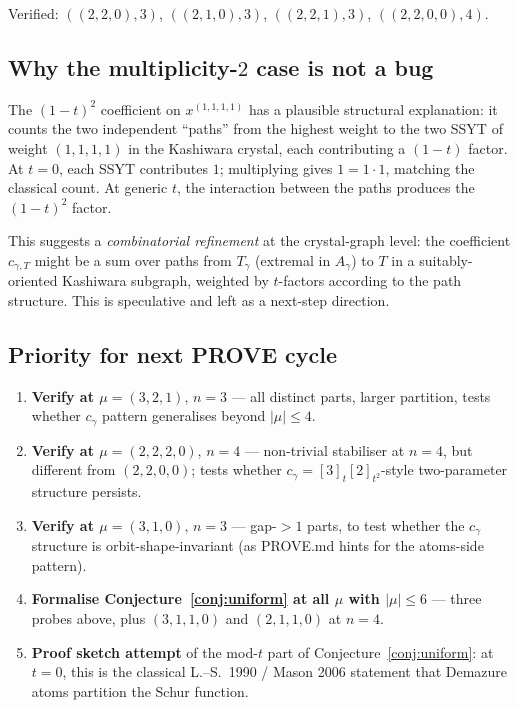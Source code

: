 \documentclass[11pt]{article}
\theoremstyle{definition}
\theoremstyle{remark}
\begin{document}
Verified: $((2,2,0), 3)$, $((2,1,0), 3)$, $((2,2,1), 3)$, $((2,2,0,0), 4)$.

\subsection{Why the multiplicity-$2$ case is not a bug}

The $(1-t)^2$ coefficient on $x^{(1,1,1,1)}$ has a plausible structural
explanation: it counts the two independent ``paths'' from the highest
weight to the two SSYT of weight $(1,1,1,1)$ in the Kashiwara crystal,
each contributing a $(1-t)$ factor. At $t=0$, each SSYT contributes
$1$; multiplying gives $1 = 1 \cdot 1$, matching the classical count.
At generic $t$, the interaction between the paths produces the
$(1-t)^2$ factor.

This suggests a \emph{combinatorial refinement} at the crystal-graph
level: the coefficient $c_{\gamma, T}$ might be a sum over paths from
$T_\gamma$ (extremal in $A_\gamma$) to $T$ in a suitably-oriented
Kashiwara subgraph, weighted by $t$-factors according to the path
structure. This is speculative and left as a next-step direction.

\subsection{Priority for next PROVE cycle}

\begin{enumerate}
   \item \textbf{Verify at $\mu = (3,2,1),\, n = 3$} --- all distinct
         parts, larger partition, tests whether $c_\gamma$ pattern
         generalises beyond $|\mu| \leq 4$.
   \item \textbf{Verify at $\mu = (2,2,2,0),\, n = 4$} --- non-trivial
         stabiliser at $n=4$, but different from $(2,2,0,0)$; tests
         whether $c_\gamma = [3]_t [2]_{t^2}$-style two-parameter
         structure persists.
   \item \textbf{Verify at $\mu = (3,1,0),\, n = 3$} --- gap-$>1$ parts,
         to test whether the $c_\gamma$ structure is orbit-shape-invariant
         (as PROVE.md hints for the atoms-side pattern).
   \item \textbf{Formalise Conjecture~\ref{conj:uniform} at all $\mu$
         with $|\mu| \leq 6$} --- three probes above, plus $(3,1,1,0)$
         and $(2,1,1,0)$ at $n = 4$.
   \item \textbf{Proof sketch attempt} of the mod-$t$ part of
         Conjecture~\ref{conj:uniform}: at $t=0$, this is the classical
         L.--S.\ 1990 / Mason 2006 statement that Demazure atoms
         partition the Schur function.
\end{enumerate}
\end{document}
